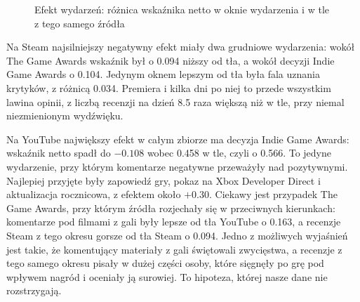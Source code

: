 \begin{figure}[hbp]
  \centering
  \caption{Efekt wydarzeń: różnica wskaźnika netto w oknie wydarzenia i w tle z tego samego źródła}
  \label{fig:event-lift}
\end{figure}

Na Steam najsilniejszy negatywny efekt miały dwa grudniowe wydarzenia: wokół The Game Awards wskaźnik był o \num{0.094} niższy od tła, a wokół decyzji Indie Game Awards o \num{0.104}.
Jedynym oknem lepszym od tła była fala uznania krytyków, z różnicą \num{0.034}.
Premiera i kilka dni po niej to przede wszystkim lawina opinii, z liczbą recenzji na dzień \num{8.5} raza większą niż w tle, przy niemal niezmienionym wydźwięku.

Na YouTube największy efekt w całym zbiorze ma decyzja Indie Game Awards: wskaźnik netto spadł do $-\num{0.108}$ wobec \num{0.458} w tle, czyli o \num{0.566}.
To jedyne wydarzenie, przy którym komentarze negatywne przeważyły nad pozytywnymi.
Najlepiej przyjęte były zapowiedź gry, pokaz na Xbox Developer Direct i aktualizacja rocznicowa, z efektem około $+\num{0.30}$.
Ciekawy jest przypadek The Game Awards, przy którym źródła rozjechały się w przeciwnych kierunkach: komentarze pod filmami z gali były lepsze od tła YouTube o \num{0.163}, a recenzje Steam z tego okresu gorsze od tła Steam o \num{0.094}.
Jedno z możliwych wyjaśnień jest takie, że komentujący materiały z gali świętowali zwycięstwa, a recenzje z tego samego okresu pisały w dużej części osoby, które sięgnęły po grę pod wpływem nagród i oceniały ją surowiej.
To hipoteza, której nasze dane nie rozstrzygają.

